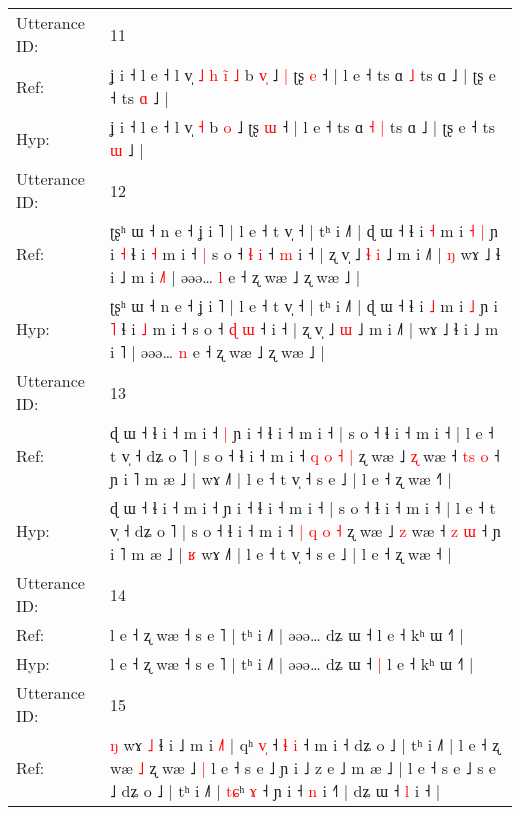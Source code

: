 \documentclass[10pt]{article}
\DeclareRobustCommand{\hl}[1]{{\textcolor{red}{#1}}}
\begin{document}
\begin{longtable}{ll}
 \\
\midrule
Utterance ID: & 11 \\
Ref: & ʝ i ˧ l e ˧ l v̩\hl{ }\hl{˩}\hl{ }\hl{h}\hl{ }\hl{i}\hl{̃} \hl{˩} b \hl{v}\hl{̩} ˩\hl{ }\hl{|} ʈʂ \hl{e} ˧ | l e ˧ ts ɑ\hl{}\hl{} \hl{˩} ts ɑ ˩ | ʈʂ e ˧ ts \hl{ɑ} ˩ |
 \\
Hyp: & ʝ i ˧ l e ˧ l v̩\hl{}\hl{}\hl{}\hl{}\hl{}\hl{}\hl{} \hl{˧} b \hl{}\hl{o} ˩\hl{}\hl{} ʈʂ \hl{ɯ} ˧ | l e ˧ ts ɑ\hl{ }\hl{˧} \hl{|} ts ɑ ˩ | ʈʂ e ˧ ts \hl{ɯ} ˩ |
 \\
\midrule
Utterance ID: & 12 \\
Ref: & ʈʂʰ ɯ ˧ n e ˧ ʝ i ˥ | l e ˧ t v̩ ˧ | tʰ i ˩˥ | ɖ ɯ ˧ ɬ i \hl{˧} m i\hl{ }\hl{˧} \hl{|} ɲ i \hl{˧} ɬ i \hl{˧} m i ˧\hl{ }\hl{|} s o ˧ \hl{ɬ} \hl{i} ˧\hl{ }\hl{m} i ˧ | ʐ v̩ ˩\hl{ }\hl{ɬ} \hl{i} ˩ m i ˩˥ |\hl{ }\hl{ŋ} wɤ ˩ ɬ i ˩ m i \hl{˩}˥ | əəə… \hl{l} e ˧ ʐ wæ ˩ ʐ wæ ˩ |
 \\
Hyp: & ʈʂʰ ɯ ˧ n e ˧ ʝ i ˥ | l e ˧ t v̩ ˧ | tʰ i ˩˥ | ɖ ɯ ˧ ɬ i \hl{˩} m i\hl{}\hl{} \hl{˩} ɲ i \hl{˥} ɬ i \hl{˩} m i ˧\hl{}\hl{} s o ˧ \hl{ɖ} \hl{ɯ} ˧\hl{}\hl{} i ˧ | ʐ v̩ ˩\hl{}\hl{} \hl{ɯ} ˩ m i ˩˥ |\hl{}\hl{} wɤ ˩ ɬ i ˩ m i \hl{}˥ | əəə… \hl{n} e ˧ ʐ wæ ˩ ʐ wæ ˩ |
 \\
\midrule
Utterance ID: & 13 \\
Ref: & ɖ ɯ ˧ ɬ i ˧ m i ˧\hl{ }\hl{|} ɲ i ˧ ɬ i ˧ m i ˧ | s o ˧ ɬ i ˧ m i ˧ | l e ˧ t v̩ ˧ dʑ o ˥ | s o ˧ ɬ i ˧ m i ˧ \hl{q} \hl{o} \hl{˧} \hl{|} ʐ wæ ˩ \hl{ʐ} wæ ˧ \hl{t}\hl{s} \hl{o} ˧ ɲ i ˥ m æ ˩ |\hl{}\hl{} wɤ ˩˥ | l e ˧ t v̩ ˧ s e ˩ | l e ˧ ʐ wæ ˧\hl{˥} |
 \\
Hyp: & ɖ ɯ ˧ ɬ i ˧ m i ˧\hl{}\hl{} ɲ i ˧ ɬ i ˧ m i ˧ | s o ˧ ɬ i ˧ m i ˧ | l e ˧ t v̩ ˧ dʑ o ˥ | s o ˧ ɬ i ˧ m i ˧ \hl{|} \hl{q} \hl{o} \hl{˧} ʐ wæ ˩ \hl{z} wæ ˧ \hl{}\hl{z} \hl{ɯ} ˧ ɲ i ˥ m æ ˩ |\hl{ }\hl{ʁ} wɤ ˩˥ | l e ˧ t v̩ ˧ s e ˩ | l e ˧ ʐ wæ ˧\hl{} |
 \\
\midrule
Utterance ID: & 14 \\
Ref: & l e ˧ ʐ wæ ˧ s e ˥ | tʰ i ˩˥ | əəə… dʑ ɯ ˧\hl{}\hl{} l e ˧ kʰ ɯ ˧˥ |
 \\
Hyp: & l e ˧ ʐ wæ ˧ s e ˥ | tʰ i ˩˥ | əəə… dʑ ɯ ˧\hl{ }\hl{|} l e ˧ kʰ ɯ ˧˥ |
 \\
\midrule
Utterance ID: & 15 \\
Ref: & \hl{ŋ} wɤ\hl{}\hl{} \hl{˩} ɬ i ˩ m i \hl{˩}\hl{˥} | qʰ \hl{v}\hl{̩} ˧ \hl{ɬ} \hl{i} ˧ m i ˧ dʑ o ˩ | tʰ i ˩˥ | l e ˧ ʐ wæ \hl{˩} ʐ wæ ˩\hl{ }\hl{|} l e ˧ s e ˩ ɲ i ˩ z e ˩ m æ ˩ | l e ˧ s e ˩ s e ˩ dʑ o ˩ | tʰ i ˩˥ | \hl{}\hl{}\hl{}\hl{}\hl{t}\hl{ɕ}ʰ \hl{ɤ} ˧ ɲ i ˧ \hl{n} i ˧\hl{˥} | dʑ ɯ ˧ \hl{l} i ˧ |

\end{longtable}
\end{document}
